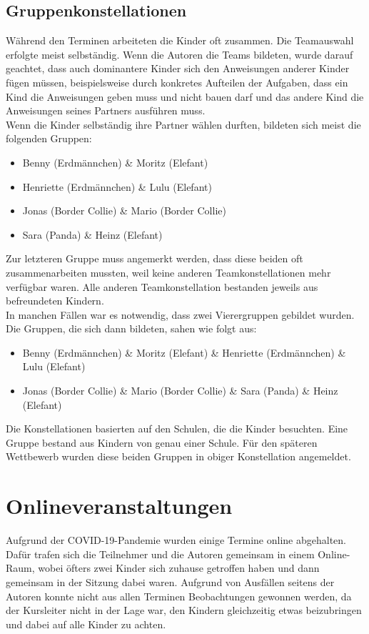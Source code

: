 \subsection{Gruppenkonstellationen}
Während den Terminen arbeiteten die Kinder oft zusammen. Die Teamauswahl erfolgte meist selbständig. Wenn die Autoren die Teams bildeten, wurde darauf geachtet, dass auch dominantere Kinder sich den Anweisungen anderer Kinder fügen müssen, beispielsweise durch konkretes Aufteilen der Aufgaben, dass ein Kind die Anweisungen geben muss und nicht bauen darf und das andere Kind die Anweisungen seines Partners ausführen muss.\\
Wenn die Kinder selbständig ihre Partner wählen durften, bildeten sich meist die folgenden Gruppen:\\
\begin{itemize}
	\item Benny (Erdmännchen) \& Moritz (Elefant)
	\item Henriette (Erdmännchen) \& Lulu (Elefant)
	\item Jonas (Border Collie) \& Mario (Border Collie)
	\item Sara (Panda) \& Heinz (Elefant)
\end{itemize}
Zur letzteren Gruppe muss angemerkt werden, dass diese beiden oft zusammenarbeiten mussten, weil keine anderen Teamkonstellationen mehr verfügbar waren. Alle anderen Teamkonstellation bestanden jeweils aus befreundeten Kindern.\\
In manchen Fällen war es notwendig, dass zwei Vierergruppen gebildet wurden. Die Gruppen, die sich dann bildeten, sahen wie folgt aus:
\begin{itemize}
	\item Benny (Erdmännchen) \& Moritz (Elefant) \& Henriette (Erdmännchen) \& Lulu (Elefant)
	\item Jonas (Border Collie) \& Mario (Border Collie) \& Sara (Panda) \& Heinz (Elefant)
\end{itemize}
Die Konstellationen basierten auf den Schulen, die die Kinder besuchten. Eine Gruppe bestand aus Kindern von genau einer Schule. Für den späteren Wettbewerb wurden diese beiden Gruppen in obiger Konstellation angemeldet.\\


\section{Onlineveranstaltungen}
Aufgrund der COVID-19-Pandemie wurden einige Termine online abgehalten. Dafür trafen sich die Teilnehmer und die Autoren gemeinsam in einem Online-Raum, wobei öfters zwei Kinder sich zuhause getroffen haben und dann gemeinsam in der Sitzung dabei waren. Aufgrund von Ausfällen seitens der Autoren konnte nicht aus allen Terminen Beobachtungen gewonnen werden, da der Kursleiter nicht in der Lage war, den Kindern gleichzeitig etwas beizubringen und dabei auf alle Kinder zu achten.\\

